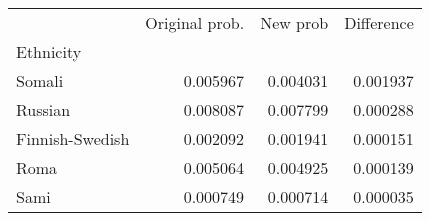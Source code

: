 \begin{tabular}{lrrr}
\toprule
{} &  Original prob. &  New prob &  Difference \\
Ethnicity       &                 &           &             \\
\midrule
Somali          &        0.005967 &  0.004031 &    0.001937 \\
Russian         &        0.008087 &  0.007799 &    0.000288 \\
Finnish-Swedish &        0.002092 &  0.001941 &    0.000151 \\
Roma            &        0.005064 &  0.004925 &    0.000139 \\
Sami            &        0.000749 &  0.000714 &    0.000035 \\
\bottomrule
\end{tabular}
